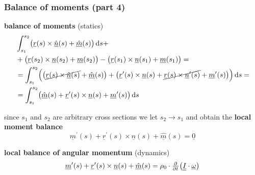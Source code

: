 \begin{frame}
  \frametitle{Balance of moments (part 4)}
  
  \textbf{balance of moments} (statics)
  \begin{displaymath}
    \begin{alignedat}{1}
      &\int_{s_1}^{s_2} \bigl( \underline{r}(s) \times \underline{\hat{n}}(s) + \underline{\hat{m}}(s)\bigr) \dif s + \\ 
      &+ \bigl( \underline{r}(s_2) \times \underline{n}(s_2) + \underline{m}(s_2) \bigr)
         - \bigl( \underline{r}(s_1) \times \underline{n}(s_1) + \underline{m}(s_1) \bigr) = \\
      &= \int_{s_1}^{s_2} \Bigl( \bigl( \cancel{\underline{r}(s) \times \underline{\hat{n}}(s)} + \underline{\hat{m}}(s) \bigr) + \bigl( \underline{r}^{\prime}(s) \times \underline{n}(s) + \cancel{\underline{r}(s) \times \underline{n}^{\prime}(s)} + \underline{m}^{\prime}(s) \bigr) \Bigr) \dif s = \\
      &= \int_{s_1}^{s_2} \bigl( \underline{\hat{m}}(s) + \underline{r}^{\prime}(s) \times \underline{n}(s) + \underline{m}^{\prime}(s) \bigr) \dif s
    \end{alignedat}
  \end{displaymath}
  
  since $s_1$ and $s_2$ are arbitrary cross sections we let $s_2 \to s_1$ \newline
  and obtain the \textbf{local moment balance}
  \begin{displaymath}
    \underline{m}^{\prime}(s) + \underline{r}^{\prime}(s) \times \underline{n}(s) + \underline{\hat{m}}(s) = \underline{0}
  \end{displaymath}

  \vspace{0.7em}
  \textbf{local balance of angular momentum} (dynamics)
  \begin{displaymath}
    \underline{m}^{\prime}(s) +
    \underline{r}^{\prime}(s) \times \underline{n}(s) +
    \underline{\hat{m}}(s) =
    \rho_0 \cdot
    \pd{}{t} \bigl( \doubleunderline{I} \cdot \underline{\omega} \bigr)
  \end{displaymath}
\end{frame}



